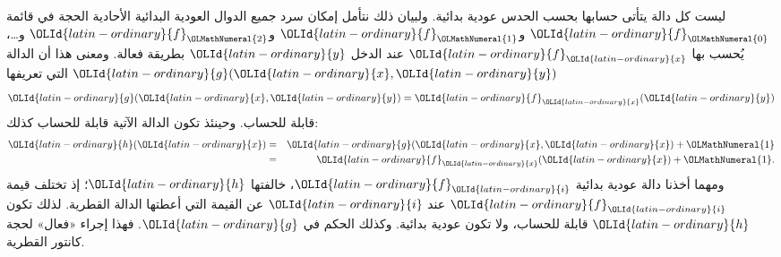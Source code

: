 \documentclass[../../../include/open-logic-section]{subfiles}
\begin{document}

ليست كل دالة يتأتى حسابها بحسب
الحدس عودية بدائية. ولبيان ذلك نتأمل إمكان سرد جميع الدوال
العودية البدائية الأحادية الحجة في قائمة $\OLId{latin-ordinary}{f}_\OLMathNumeral{0}$ و$\OLId{latin-ordinary}{f}_\OLMathNumeral{1}$ و$\OLId{latin-ordinary}{f}_\OLMathNumeral{2}$ و…،
يُحسب بها $\OLId{latin-ordinary}{f}_\OLId{latin-ordinary}{x}$ عند الدخل $\OLId{latin-ordinary}{y}$ بطريقة فعالة. ومعنى هذا
أن الدالة $\OLId{latin-ordinary}{g}(\OLId{latin-ordinary}{x},\OLId{latin-ordinary}{y})$ التي تعريفها
\[
\OLId{latin-ordinary}{g}(\OLId{latin-ordinary}{x},\OLId{latin-ordinary}{y}) = \OLId{latin-ordinary}{f}_\OLId{latin-ordinary}{x}(\OLId{latin-ordinary}{y})
\]
قابلة للحساب. وحينئذ تكون الدالة الآتية قابلة للحساب كذلك:
\begin{eqnarray*}
\OLId{latin-ordinary}{h}(\OLId{latin-ordinary}{x}) & = & \OLId{latin-ordinary}{g}(\OLId{latin-ordinary}{x},\OLId{latin-ordinary}{x}) + \OLMathNumeral{1} \\
& = & \OLId{latin-ordinary}{f}_\OLId{latin-ordinary}{x}(\OLId{latin-ordinary}{x}) +\OLMathNumeral{1}.
\end{eqnarray*}
ومهما أخذنا دالة عودية بدائية $\OLId{latin-ordinary}{f}_\OLId{latin-ordinary}{i}$، خالفتها $\OLId{latin-ordinary}{h}$؛ إذ تختلف قيمة $\OLId{latin-ordinary}{f}_\OLId{latin-ordinary}{i}$ عند $\OLId{latin-ordinary}{i}$ عن القيمة التي أعطتها الدالة القطرية. لذلك
تكون $\OLId{latin-ordinary}{h}$ قابلة للحساب، ولا تكون عودية بدائية. وكذلك الحكم
في $\OLId{latin-ordinary}{g}$. فهذا إجراء «فعال» لحجة كانتور القطرية.
\end{document}
